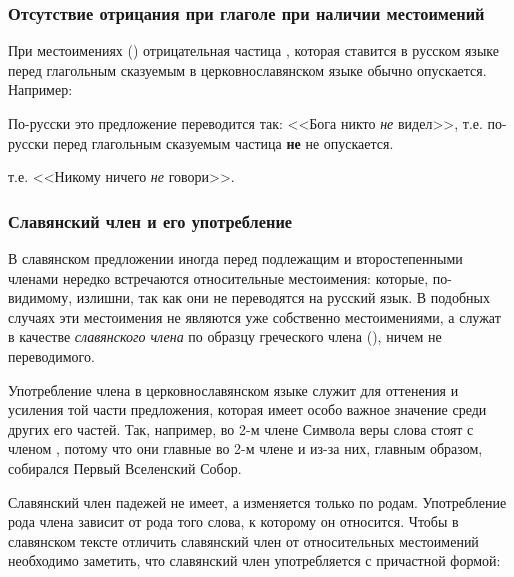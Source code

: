 \documentclass[11pt,a4paper,oneside]{memoir}
\begin{document}
                \subsubsection{Отсутствие отрицания при глаголе при наличии местоимений{}}

    При местоимениях {} ({}) отрицательная частица {\slv{}}, которая ставится в русском языке перед глагольным сказуемым в церковнославянском языке обычно опускается. Например:
    
    \bigskip{}

    По-русски это предложение переводится так: <<Бога никто \emph{не} видел>>, т.е. по-русски перед глагольным сказуемым частица \textbf{не} не опускается.
    
    \bigskip{}

    \noindent
    т.е. <<Никому ничего \emph{не} говори>>.
    
                \subsubsection{Славянский член и его употребление}

    В славянском предложении иногда перед подлежащим и второстепенными членами нередко встречаются относительные местоимения: {} которые, по-видимому, излишни, так как они не переводятся на русский язык. В подобных случаях эти местоимения не являются уже собственно местоимениями, а служат в качестве \emph{славянского члена} по образцу греческого члена (), ничем не переводимого.
    
    Употребление члена в церковнославянском языке служит для оттенения и усиления той части предложения, которая имеет особо важное значение среди других его частей. Так, например, во 2-м члене Символа веры слова {} стоят с членом {}, потому что они главные во 2-м члене и из-за них, главным образом, собирался Первый Вселенский Собор.
    
    Славянский член падежей не имеет, а изменяется только по родам. Употребление рода члена зависит от рода того слова, к которому он относится. Чтобы в славянском тексте отличить славянский член от относительных местоимений {} необходимо заметить, что славянский член употребляется с причастной формой:
    
\end{document}
